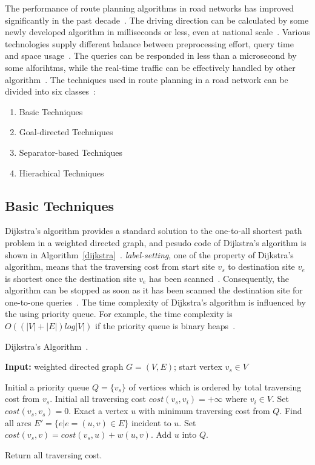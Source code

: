 \documentclass[conference]{IEEEtran}
\begin{document}
The performance of route planning algorithms in road networks has improved significantly in the past decade~\cite{self_driving}. The driving direction can be calculated by some newly developed algorithm in milliseconds or less, even at national scale~\cite{bast2016route}. Various technologies supply different balance between preprocessing effort, query time and space usage~\cite{bast2016route}. The queries can be responded in less than a microsecond by some alforihtms, while the real-time traffic can be effectively handled by other algorithm~\cite{bast2016route}. The techniques used in route planning in a road network can be divided into six classes~\cite{bast2016route}:
\begin{enumerate}
	\item Basic Techniques
	\item Goal-directed Techniques
	\item Separator-based Techniques
	\item Hierachical Techniques
\end{enumerate}

\subsection{Basic Techniques}\label{subsec:basic_techniques}
Dijkstra's algorithm provides a standard solution to the one-to-all shortest path problem in a weighted directed graph, and pesudo code of Dijkstra's algorithm is shown in Algorithm~\ref{dijkstra}~\cite{dijkstra1959note}. \emph{label-setting}, one of the property of Dijkstra's algorithm, means that the traversing cost from start site $v_s$ to destination site $v_e$ is shortest once the destination site $v_e$ has been scanned~\cite{dijkstra1959note}. Consequently, the algorithm can be stopped as soon as it has been scanned the destination site for one-to-one queries~\cite{bast2016route}. The time complexity of Dijkstra's algorithm is influenced by the using priority queue. For example, the time complexity is $O((|V|+|E|)log|V|)$ if the priority queue is binary heaps~\cite{forsythe1964algorithms}.
\begin{algorithm}[htbp]
	\caption{\label{dijkstra}Dijkstra's Algorithm~\cite{dijkstra1959note}.}
	{\bf Input:} weighted directed graph $G=(V, E)$; start vertex $v_s \in V$
	\begin{algorithmic}[1]
		\State Initial a priority queue $Q=\{v_s\}$ of vertices which is ordered by total traversing cost from $v_s$.
		\State Initial all traversing cost $cost(v_s, v_i)=+\infty$ where $v_i \in V$.
		\State Set $cost(v_s, v_s) = 0$.
			\State Exact a vertex $u$ with minimum traversing cost from $Q$.
			\State Find all arcs $E' = \{e | e=(u, v) \in E\}$ incident to $u$.
					\State Set $cost(v_s, v) = cost(v_s, u)+w(u,v)$.
				\EndIf
			\State Add $u$ into $Q$.
			\EndFor
			
		\EndWhile
		\State Return all traversing cost.
	\end{algorithmic}
\end{algorithm}
\end{document}
